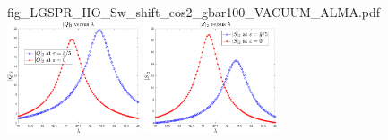 \documentclass[11pt]{article}
\begin{document}
\begin{figure}[H]
{		{fig_LGSPR_IIO_Sw_shift_cos2_gbar100_VACUUM_ALMA.pdf}}
	\\
	\subfigure 
	{\includegraphics[width=0.35\textwidth]
		{fig_LGSPR_IIO_Qu_shift_cos2_gbar1000_VACUUM_ALMA.pdf}}
	\quad
	\subfigure 
	{\includegraphics[width=0.35\textwidth]
		{fig_LGSPR_IIO_Sw_shift_cos2_gbar1000_VACUUM_ALMA.pdf}}
\end{figure}
\end{document}

